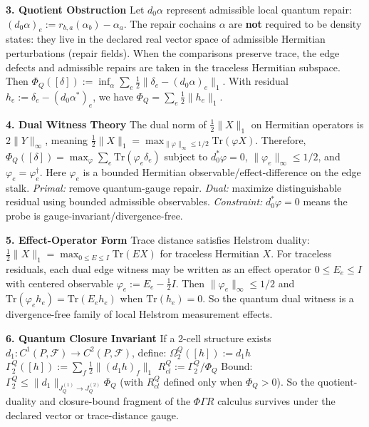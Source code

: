 \documentclass[
  11pt,
]{article}
\begin{document}
\textbf{3. Quotient Obstruction}
Let \(d_0\alpha\) represent admissible local quantum repair: \((d_0\alpha)_e := r_{b,a}(\alpha_b) - \alpha_a\). The repair cochains \(\alpha\) are \textbf{not} required to be density states: they live in the declared real vector space of admissible Hermitian perturbations (repair fields). When the comparisons preserve trace, the edge defects and admissible repairs are taken in the traceless Hermitian subspace.
Then \(\Phi_Q([\delta]) := \inf_\alpha \sum_e \frac{1}{2} \|\delta_e - (d_0\alpha)_e\|_1\).
With residual \(h_e := \delta_e - (d_0\alpha^*)_e\), we have \(\Phi_Q = \sum_e \frac{1}{2} \|h_e\|_1\).

\textbf{4. Dual Witness Theory}
The dual norm of \(\frac{1}{2}\|X\|_1\) on Hermitian operators is \(2\|Y\|_\infty\), meaning \(\frac{1}{2}\|X\|_1 = \max_{\|\varphi\|_\infty \le 1/2} \text{Tr}(\varphi X)\).
Therefore, \(\Phi_Q([\delta]) = \max_\varphi \sum_e \text{Tr}(\varphi_e \delta_e)\)
subject to \(d_0^*\varphi = 0\), \(\|\varphi_e\|_\infty \le 1/2\), and \(\varphi_e = \varphi_e^\dagger\).
Here \(\varphi_e\) is a bounded Hermitian observable/effect-difference on the edge stalk.
\emph{Primal:} remove quantum-gauge repair. \emph{Dual:} maximize distinguishable residual using bounded admissible observables. \emph{Constraint:} \(d_0^*\varphi = 0\) means the probe is gauge-invariant/divergence-free.

\textbf{5. Effect-Operator Form}
Trace distance satisfies Helstrom duality: \(\frac{1}{2}\|X\|_1 = \max_{0 \le E \le I} \text{Tr}(E X)\) for traceless Hermitian \(X\).
For traceless residuals, each dual edge witness may be written as an effect operator \(0 \le E_e \le I\) with centered observable \(\varphi_e := E_e - \frac{1}{2} I\).
Then \(\|\varphi_e\|_\infty \le 1/2\) and \(\text{Tr}(\varphi_e h_e) = \text{Tr}(E_e h_e)\) when \(\text{Tr}(h_e)=0\). So the quantum dual witness is a divergence-free family of local Helstrom measurement effects.

\textbf{6. Quantum Closure Invariant}
If a 2-cell structure exists \(d_1 : C^1(P,\mathcal{F}) \to C^2(P,\mathcal{F})\), define:
\(\Omega_2^Q([h]) := d_1 h\)
\(\Gamma_2^Q([h]) := \sum_f \frac{1}{2} \|(d_1 h)_f\|_1\)
\(R_{cl}^Q := \Gamma_2^Q / \Phi_Q\)
Bound: \(\Gamma_2^Q \le \|d_1\|_{J_Q^{(1)}\to J_Q^{(2)}} \Phi_Q\) (with \(R_{cl}^Q\) defined only when \(\Phi_Q>0\)).
So the quotient-duality and closure-bound fragment of the \(\Phi\Gamma R\) calculus survives under the declared vector or trace-distance gauge.
\end{document}
